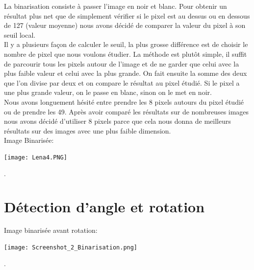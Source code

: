 \documentclass [french,12pt]{article}
\begin{document}
La binarisation consiste à passer l’image en noir et blanc. Pour obtenir un résultat plus net que de simplement vérifier si le pixel est au dessus ou en dessous de 127 (valeur moyenne) nous avons décidé de comparer la valeur du pixel à son seuil local. 
	\\Il y a plusieurs façon de calculer le seuil, la plus grosse différence est de choisir le nombre de pixel que nous voulons étudier. La méthode est plutôt simple, il suffit de parcourir tous les pixels autour de l’image et de ne garder que celui avec la plus faible valeur et celui avec la plus grande. On fait ensuite la somme des deux que l’on divise par deux et on compare le résultat au pixel étudié. Si le pixel a une plus grande valeur, on le passe en blanc, sinon on le met en noir.
 \\Nous avons longuement hésité entre prendre les 8 pixels autours du pixel étudié ou de prendre les 49. Après avoir comparé les résultats sur de nombreuses images nous avons décidé d’utiliser 8 pixels parce que cela nous donna de meilleurs résultats sur des images avec une plus faible dimension.
\\
Image Binarisée:
\\
\begin{center} \texttt{[image: Lena4.PNG]} \end{center}.
\\

\section{Détection d'angle et rotation}

Image binarisée avant rotation:
\\
\begin{center} \texttt{[image: Screenshot\_2\_Binarisation.png]} \end{center}.
\\
\end{document}
